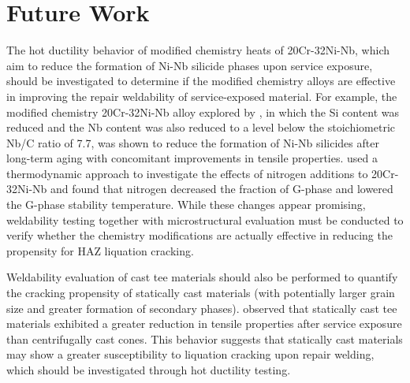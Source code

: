 \chapter{Future Work} \label{ch:future-work}
The hot ductility behavior of modified chemistry heats of 20Cr-32Ni-Nb, which aim to reduce the formation of Ni-Nb silicide phases upon service exposure, should be investigated to determine if the modified chemistry alloys are effective in improving the repair weldability of service-exposed material. For example, the modified chemistry 20Cr-32Ni-Nb alloy explored by \citet{hoffman_cast_2003}, in which the Si content was reduced and the Nb content was also reduced to a level below the stoichiometric Nb/C ratio of 7.7, was shown to reduce the formation of Ni-Nb silicides after long-term aging with concomitant improvements in tensile properties. \citet{dewar_correlation_2013} used a thermodynamic approach to investigate the effects of nitrogen additions to 20Cr-32Ni-Nb and found that nitrogen decreased the fraction of G-phase and lowered the G-phase stability temperature. While these changes appear promising, weldability testing together with microstructural evaluation must be conducted to verify whether the chemistry modifications are actually effective in reducing the propensity for HAZ liquation cracking.

Weldability evaluation of cast tee materials should also be performed to quantify the cracking propensity of statically cast materials (with potentially larger grain size and greater formation of secondary phases). \citet{hoffman_high_2000-1} observed that statically cast tee materials exhibited a greater reduction in tensile properties after service exposure than centrifugally cast cones. This behavior suggests that statically cast materials may show a greater susceptibility to liquation cracking upon repair welding, which should be investigated through hot ductility testing.


